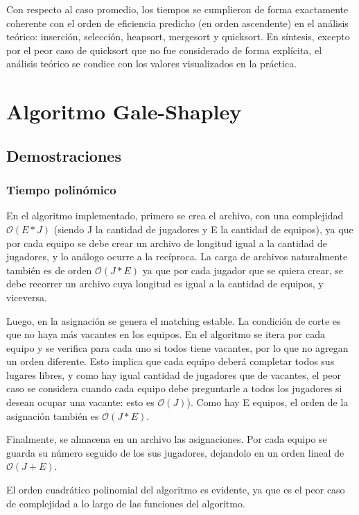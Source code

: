 \documentclass[article,a4paper]{article}
\begin{document}
Con respecto al caso promedio, los tiempos se cumplieron de forma exactamente coherente con el orden de eficiencia predicho (en orden ascendente) en el análisis teórico: inserción, selección, heapsort, mergesort y quicksort. En síntesis, excepto por el peor caso de quicksort que no fue considerado de forma explícita, el análisis teórico se condice con los valores visualizados en la práctica.

\section{Algoritmo Gale-Shapley}

\subsection{Demostraciones}

\subsubsection{Tiempo polinómico}

En el algoritmo implementado, primero se crea el archivo, con una complejidad $\mathcal O(E*J)$ (siendo J la cantidad de jugadores y E la cantidad de equipos), ya que por cada equipo se debe crear un archivo de longitud igual a la cantidad de jugadores, y lo análogo ocurre a la recíproca. La carga de archivos  naturalmente también es de orden $\mathcal O(J*E)$ ya que por cada jugador que se quiera crear, se debe recorrer un archivo cuya longitud es igual a la cantidad de equipos, y viceversa.

Luego, en la asignación se genera el matching estable. La condición de corte es que no haya más vacantes en los equipos. En el algoritmo se itera por cada equipo y se verifica para cada uno si todos tiene vacantes, por lo que no agregan un orden diferente. Esto implica que cada equipo deberá completar todos sus lugares libres, y como hay igual cantidad de jugadores que de vacantes, el peor caso se considera cuando cada equipo debe preguntarle a todos los jugadores si desean ocupar una vacante: esto es $\mathcal O(J)$). Como hay E equipos, el orden de la asignación también es $\mathcal O(J*E)$.

Finalmente, se almacena en un archivo las asignaciones. Por cada equipo se guarda su número seguido de los sus jugadores, dejandolo en un orden lineal de $\mathcal O(J+E)$.

El orden cuadrático polinomial del algoritmo es evidente, ya que es el peor caso de complejidad a lo largo de las funciones del algoritmo.
\end{document}
